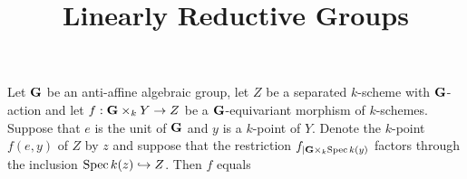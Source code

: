 



\title{Linearly Reductive Groups}
\date{}
\maketitle

\begin{theorem}[Rigidity]\label{theorem:rigidity_result}
Let $\mathbf{G}$ be an anti-affine algebraic group, let $Z$ be a separated $k$-scheme with $\mathbf{G}$-action and let $f:\mathbf{G}\times_kY\rightarrow Z$ be a $\mathbf{G}$-equivariant morphism of $k$-schemes. Suppose that $e$ is the unit of $\mathbf{G}$ and $y$ is a $k$-point of $Y$. Denote the $k$-point $f(e,y)$ of $Z$ by $z$ and suppose that the restriction $f_{\mid \mathbf{G}\times_k \mathrm{Spec}\, k(y)}$ factors through the inclusion $\mathrm{Spec}\, k(z) \hookrightarrow Z$. Then $f$ equals
\begin{center}
\end{center}
\end{theorem}
